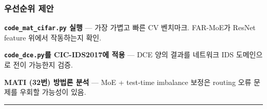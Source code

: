 \subsubsection{우선순위 제안}
\par\noindent \textbullet\enspace \textbf{\texttt{code\_\allowbreak{}\allowbreak{}mat\allowbreak{}\_\allowbreak{}\allowbreak{}cifar.\allowbreak{}p\allowbreak{}y} 실행} — 가장 가볍고 빠른 CV 벤치마크. FAR-MoE가 ResNet feature 위에서 작동하는지 확인.


\par\noindent \textbullet\enspace \textbf{\texttt{code\_\allowbreak{}\allowbreak{}dce\allowbreak{}.\allowbreak{}py}를 CIC-IDS2017에 적용} — DCE 양의 결과를 네트워크 IDS 도메인으로 전이 가능한지 검증.


\par\noindent \textbullet\enspace \textbf{MATI (32번) 방법론 분석} — MoE +\allowbreak{} test-time imbalance 보정은 routing 오류 문제를 우회할 가능성이 있음.



\medskip\hrule\medskip
